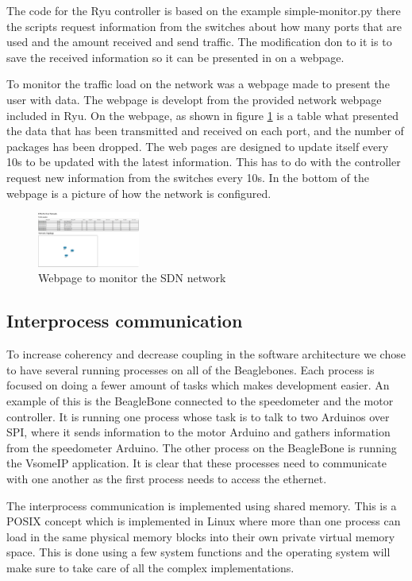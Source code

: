 \documentclass[11pt, titlepage]{article} %
\begin{document}
The code for the Ryu controller is based on the example simple-monitor.py there the scripts request information from the switches about how many ports that are used and the amount received and send traffic. The modification don to it is to save the received information so it can be presented in on a webpage.

To monitor the traffic load on the network was a webpage made to present the user with data. The webpage is developt from the provided network webpage included in Ryu. On the webpage, as shown in figure \ref{fig:webpage_sdn} is a table what presented the data that has been transmitted and received on each port, and the number of packages has been dropped. The web pages are designed to update itself every 10s to be updated with the latest information.  This has to do with the controller request new information from the switches every 10s.  In the bottom of the webpage is a picture of how the network is configured. 

\begin{figure}
	\centering
	\includegraphics[width=0.3\textwidth]{webpage.PNG}
	\caption{Webpage to monitor the SDN network}
	\label{fig:webpage_sdn}
\end{figure}


\subsection{Interprocess communication}
To increase coherency and decrease coupling in the software architecture we chose to have several running processes on all of the Beaglebones. Each process is focused on doing a fewer amount of tasks which makes development easier. An example of this is the BeagleBone connected to the speedometer and the motor controller. It is running one process whose task is to talk to two Arduinos over SPI, where it sends information to the motor Arduino and gathers information from the speedometer Arduino. The other process on the BeagleBone is running the VsomeIP application. It is clear that these processes need to communicate with one another as the first process needs to access the ethernet.

The interprocess communication is implemented using shared memory. This is a POSIX concept which is implemented in Linux where more than one process can load in the same physical memory blocks into their own private virtual memory space. This is done using a few system functions and the operating system will make sure to take care of all the complex implementations.
\end{document}

